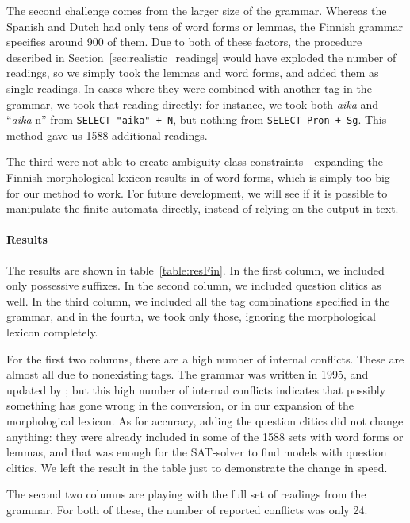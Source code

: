 The second challenge comes from the larger size of the grammar. Whereas the Spanish and Dutch had only tens of word forms or lemmas, the Finnish grammar specifies around 900 of them.
Due to both of these factors, the procedure described in Section~\ref{sec:realistic_readings} would have exploded the number of readings, so we simply took the lemmas and word forms, and added them as single readings. 
In cases where they were combined with another tag in the grammar, we took that reading directly: for instance, we took both \emph{aika} and ``\emph{aika} n'' from \texttt{SELECT "aika" + N},
but nothing from \texttt{SELECT Pron + Sg}. This method gave us 1588 additional readings.

The third were not able to create ambiguity class constraints---expanding the Finnish morphological lexicon results in  of word forms, which is simply too big for our method to work. 
For future development, we will see if it is possible to manipulate the finite automata directly, instead of relying on the output in text.


\paragraph{Results}
The results are shown in table~\ref{table:resFin}.
In the first column, we included only possessive suffixes. In the second column, we included question clitics as well.
In the third column, we included all the tag combinations specified in the grammar, and in the fourth, we took only those, ignoring the morphological lexicon completely.

For the first two columns, there are a high number of internal conflicts. 
These are almost all due to nonexisting tags. The grammar was written in 1995, and updated by ; but this high number of internal conflicts indicates that possibly something has gone wrong in the conversion, or in our expansion of the morphological lexicon.
As for accuracy, adding the question clitics did not change anything: they were already included in some of the 1588 sets with word forms or lemmas, and that was enough for the SAT-solver to find models with question clitics.
We left the result in the table just to demonstrate the change in speed.


The second two columns are playing with the full set of readings from the grammar. For both of these, the number of reported conflicts was only 24.






